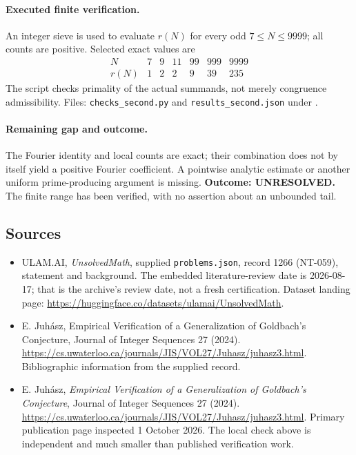\documentclass[11pt,a4paper]{article}
\begin{document}
\paragraph{Executed finite verification.}
An integer sieve is used to evaluate $r(N)$ for every odd
$7\le N\le9999$; all counts are positive. Selected exact values are
\[
\begin{array}{c|rrrrrr}
 N&7&9&11&99&999&9999\\\hline
 r(N)&1&2&2&9&39&235
\end{array}
\]
The script checks primality of the actual summands, not merely
congruence admissibility. Files: \texttt{checks\_second.py} and
\texttt{results\_second.json} under
.

\paragraph{Remaining gap and outcome.}
The Fourier identity and local counts are exact; their combination
does not by itself yield a positive Fourier coefficient. A pointwise
analytic estimate or another uniform prime-producing argument is
missing. \textbf{Outcome: UNRESOLVED.} The finite range has been
verified, with no assertion about an unbounded tail.

\subsection{Sources}

{\small

\begin{itemize}

\item[\hypertarget{source:1266:1}{S1}] ULAM.AI, \emph{UnsolvedMath}, supplied \texttt{problems.json}, record 1266 (NT-059), statement and background. The embedded literature-review date is 2026-08-17; that is the archive’s review date, not a fresh certification. Dataset landing page: \url{https://huggingface.co/datasets/ulamai/UnsolvedMath}.

\item[\hypertarget{source:1266:2}{S2}] E. Juhász, Empirical Verification of a Generalization of Goldbach's Conjecture, Journal of Integer Sequences 27 (2024). \url{https://cs.uwaterloo.ca/journals/JIS/VOL27/Juhasz/juhasz3.html}. Bibliographic information from the supplied record.


\item[E1] E. Juh\'asz, \emph{Empirical Verification of a Generalization
of Goldbach's Conjecture}, Journal of Integer Sequences 27 (2024).
\url{https://cs.uwaterloo.ca/journals/JIS/VOL27/Juhasz/juhasz3.html}.
Primary publication page inspected 1 October 2026. The local check above
is independent and much smaller than published verification work.

\end{itemize}

}

\label{end:1266}
\end{document}
